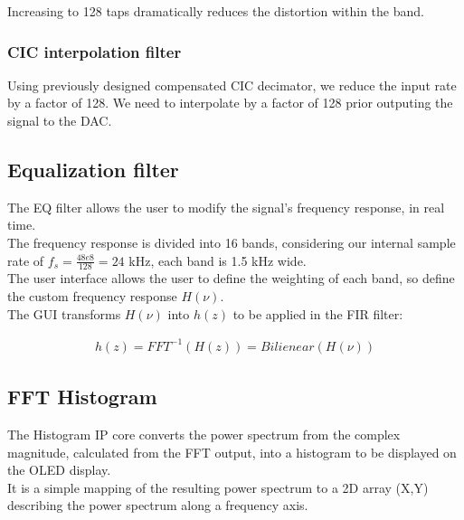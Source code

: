 \documentclass{article}
\begin{document}
\begin{center}
\begin{minipage}{0.40\linewidth}
		Increasing to 128 taps dramatically reduces
		the distortion within the band.
	\end{minipage}
\end{center}

\subsubsection{CIC interpolation filter}

Using previously designed compensated CIC decimator,
we reduce the input rate by a factor of 128.
We need to interpolate by a factor of 128 prior
outputing the signal to the DAC.


\newpage
\subsection{Equalization filter}

The EQ filter allows the user 
to modify the signal's frequency response,
in real time. \\

The frequency response is divided into 16 bands,
considering our internal sample rate of 
$f_s = \frac{48e8}{128} = 24$ kHz,
each band is 1.5 kHz wide. \\

The user interface allows the user
to define the weighting of each band,
so define the custom frequency response
$H(\nu)$. \\

The GUI transforms $H(\nu)$ into $h(z)$
to be applied in the FIR filter:

\begin{equation}
	\begin{split}
	h(z) = FFT^{-1}\left(H(z)\right) = Bilienear(H(\nu))
	\end{split}
\end{equation}

\newpage
\subsection{FFT Histogram}

The Histogram IP core converts
the power spectrum from the
complex magnitude, calculated from the
FFT output, into a 
histogram to be displayed on the OLED display. \\

It is a simple mapping of the resulting
power spectrum to a 2D array (X,Y) describing
the power spectrum along a frequency axis. \\ 
\end{document}
